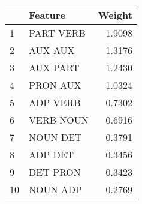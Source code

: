 \begin{tabular}{llr}
\toprule
{} &    Feature &  Weight \\
\midrule
1  &  PART VERB &  1.9098 \\
2  &    AUX AUX &  1.3176 \\
3  &   AUX PART &  1.2430 \\
4  &   PRON AUX &  1.0324 \\
5  &   ADP VERB &  0.7302 \\
6  &  VERB NOUN &  0.6916 \\
7  &   NOUN DET &  0.3791 \\
8  &    ADP DET &  0.3456 \\
9  &   DET PRON &  0.3423 \\
10 &   NOUN ADP &  0.2769 \\
\bottomrule
\end{tabular}
